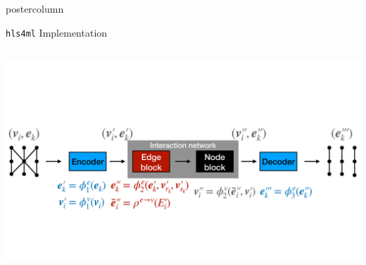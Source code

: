 \documentclass[final,hyperref={pdfpagelabels=false}]{beamer}
\newcommand{\hlsfml}{{\texttt{hls4ml}}\xspace}
\begin{document}
\begin{frame}
\begin{columns}
\begin{column}{.49\textwidth}
\begin{beamercolorbox}[center,wd=\textwidth]{postercolumn}
\begin{minipage}[T]{.95\textwidth}
{\begin{block}{{\hlsfml} Implementation}
\begin{columns}
\begin{column}{.49\textwidth}
\begin{center}
                  \includegraphics[width=0.9\linewidth]{figures/hls4ml_GNN.pdf}
                \end{center}
              \end{column}
              \end{columns}
            \end{block}
            
}
\end{minipage}
\end{beamercolorbox}
\end{column}
\end{columns}
\end{frame}
\end{document}
